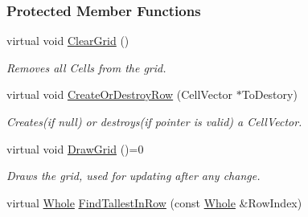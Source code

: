 \subsubsection*{Protected Member Functions}
\begin{DoxyCompactItemize}
\item 
\hypertarget{classphys_1_1UI_1_1CellGrid_a62025df19045011c3ef7958c253f8f3c}{
virtual void \hyperlink{classphys_1_1UI_1_1CellGrid_a62025df19045011c3ef7958c253f8f3c}{ClearGrid} ()}
\label{classphys_1_1UI_1_1CellGrid_a62025df19045011c3ef7958c253f8f3c}

\begin{DoxyCompactList}\small\item\em Removes all Cells from the grid. \item\end{DoxyCompactList}\item 
\hypertarget{classphys_1_1UI_1_1CellGrid_af4f183946fb12cb9150b337c17343c31}{
virtual void \hyperlink{classphys_1_1UI_1_1CellGrid_af4f183946fb12cb9150b337c17343c31}{CreateOrDestroyRow} (CellVector $\ast$ToDestory)}
\label{classphys_1_1UI_1_1CellGrid_af4f183946fb12cb9150b337c17343c31}

\begin{DoxyCompactList}\small\item\em Creates(if null) or destroys(if pointer is valid) a CellVector. \item\end{DoxyCompactList}\item 
\hypertarget{classphys_1_1UI_1_1CellGrid_ada5c15ae1b0372277d1bde05e348ccfd}{
virtual void \hyperlink{classphys_1_1UI_1_1CellGrid_ada5c15ae1b0372277d1bde05e348ccfd}{DrawGrid} ()=0}
\label{classphys_1_1UI_1_1CellGrid_ada5c15ae1b0372277d1bde05e348ccfd}

\begin{DoxyCompactList}\small\item\em Draws the grid, used for updating after any change. \item\end{DoxyCompactList}\item 
\hypertarget{classphys_1_1UI_1_1CellGrid_ae2970e94e9f4e79520ff93bb0c3238b0}{
virtual \hyperlink{namespacephys_a460f6bc24c8dd347b05e0366ae34f34a}{Whole} \hyperlink{classphys_1_1UI_1_1CellGrid_ae2970e94e9f4e79520ff93bb0c3238b0}{FindTallestInRow} (const \hyperlink{namespacephys_a460f6bc24c8dd347b05e0366ae34f34a}{Whole} \&RowIndex)}
\label{classphys_1_1UI_1_1CellGrid_ae2970e94e9f4e79520ff93bb0c3238b0}


\end{DoxyCompactItemize}
